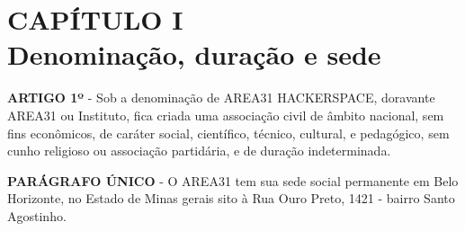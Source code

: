 \chapter*{CAPÍTULO I \\ Denominação, duração e sede}

\textbf{ARTIGO 1º} - Sob a denominação de AREA31 HACKERSPACE, 
doravante AREA31 ou Instituto, fica criada uma associação civil de 
âmbito nacional, sem fins econômicos, de caráter social, científico, 
técnico, cultural, e pedagógico, sem cunho religioso ou associação 
partidária, e de duração indeterminada.

\textbf{PARÁGRAFO ÚNICO} - O AREA31 tem sua sede social permanente em 
Belo Horizonte, no Estado de Minas gerais sito à Rua Ouro Preto, 
1421 - bairro Santo Agostinho.
